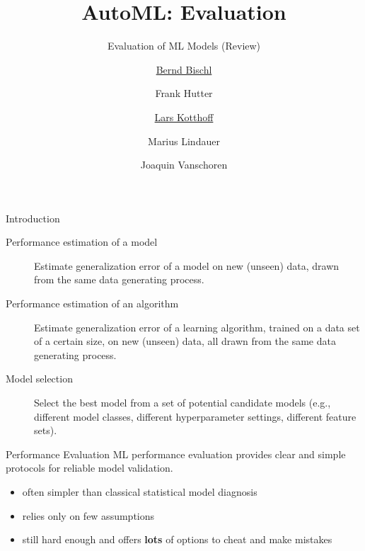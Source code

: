 




\title[AutoML: Risks]{AutoML: Evaluation} %
\subtitle{Evaluation of ML Models (Review)} %
\author[Lars Kotthoff]{\underline{Bernd Bischl} \and Frank Hutter \and \underline{Lars Kotthoff}\newline \and Marius Lindauer \and Joaquin Vanschoren}
\institute{}
\date{}

\newcommand\reffootnote[1]{%
    \begingroup
    \renewcommand\thefootnote{}\footnote{
        \tiny #1
    \vspace*{1em}}%
    \addtocounter{footnote}{-1}%
    \endgroup
}



	
	\maketitle

    \begin{frame}[c]{Introduction}
    \begin{description}
    \item[Performance estimation of a model]
        Estimate generalization error of a model on new (unseen) data, drawn from the same data generating process.
    \item[Performance estimation of an algorithm]
        Estimate generalization error of a learning algorithm, trained on a data set
        of a certain size, on new (unseen) data, all drawn from the same data generating process.
    \item[Model selection]
        Select the best model from a set of potential candidate models (e.g., different model classes, different
        hyperparameter settings, different feature sets).
    \end{description}
    \end{frame}

    \begin{frame}[c]{Performance Evaluation}
    ML performance evaluation provides clear and simple protocols for reliable model
    validation. 

    \begin{itemize}
    \item often simpler than classical statistical model diagnosis
    \item relies only on few assumptions
    \item still hard enough and offers \textbf{lots} of options to cheat and make mistakes
    \end{itemize}
    \end{frame}

